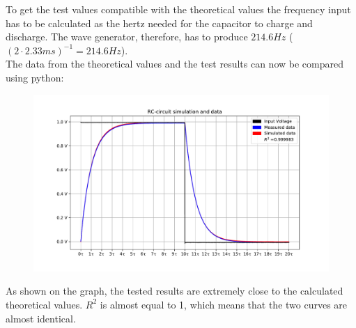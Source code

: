 To get the test values compatible with the theoretical values the frequency input has to be calculated as the hertz needed for the capacitor to charge and discharge. The wave generator, therefore, has to produce $214.6 Hz$  ($(2 \cdot 2.33 ms)^{-1} = 214.6 Hz$). \\
The data from the theoretical values and the test results can now be compared using python:
\begin{figure}[H]
\center
\includegraphics[scale=0.6]{fig/img/eks_1}
\end{figure}
As shown on the graph, the tested results are extremely close to the calculated theoretical values. $R^2$ is almost equal to 1, which means that the two curves are almost identical.

